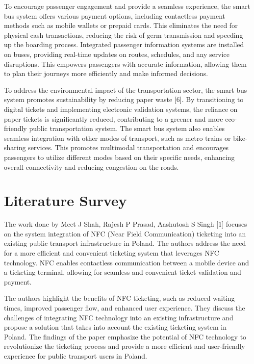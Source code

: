 \documentclass[conference]{IEEEtran}
\begin{document}
To encourage passenger engagement and provide a seamless experience, the smart bus system offers various payment options, including contactless payment methods such as mobile wallets or prepaid cards. This eliminates the need for physical cash transactions, reducing the risk of germ transmission and speeding up the boarding process. Integrated passenger information systems are installed on buses, providing real-time updates on routes, schedules, and any service disruptions. This empowers passengers with accurate information, allowing them to plan their journeys more efficiently and make informed decisions.

To address the environmental impact of the transportation sector, the smart bus system promotes sustainability by reducing paper waste [6]. By transitioning to digital tickets and implementing electronic validation systems, the reliance on paper tickets is significantly reduced, contributing to a greener and more eco-friendly public transportation system. The smart bus system also enables seamless integration with other modes of transport, such as metro trains or bike-sharing services. This promotes multimodal transportation and encourages passengers to utilize different modes based on their specific needs, enhancing overall connectivity and reducing congestion on the roads.
\section{Literature Survey}
The work done by Meet J Shah, Rajesh
P Prasad, Aashutosh
S Singh [1] focuses on the system integration of NFC (Near Field Communication) ticketing into an existing public transport infrastructure in Poland. The authors address the need for a more efficient and convenient ticketing system that leverages NFC technology. NFC enables contactless communication between a mobile device and a ticketing terminal, allowing for seamless and convenient ticket validation and payment.

		The authors highlight the benefits of NFC ticketing, such as reduced waiting times, improved passenger flow, and enhanced user experience. They discuss the challenges of integrating NFC technology into an existing infrastructure and propose a solution that takes into account the existing ticketing system in Poland. The findings of the paper emphasize the potential of NFC technology to revolutionize the ticketing process and provide a more efficient and user-friendly experience for public transport users in Poland.
\end{document}
